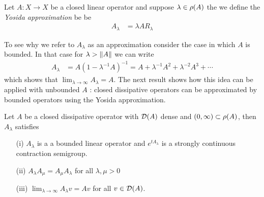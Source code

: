 \begin{defn}Let $A : X \to X$ be a closed linear operator and suppose $\lambda \in \rho(A)$ the we define the \emph{Yosida approximation} be be
\begin{align*}
A_\lambda &= \lambda A R_{\lambda}
\end{align*}
\end{defn}
To see why we refer to $A_\lambda$ as an approximation consider the case in which $A$ is bounded.  In that case for $\lambda > \lVert A \rVert$ we can write
\begin{align*}
A_\lambda &= A (1 - \lambda^{-1} A)^{-1} = A + \lambda^{-1} A^2 + \lambda^{-2} A^3 + \cdots
\end{align*}
which shows that $\lim_{\lambda \to \infty} A_\lambda = A$.
The next result shows how this idea can be applied with unbounded $A$ : closed dissipative operators can be approximated by bounded operators using the Yosida approximation.
\begin{lem}\label{ClosedDissipativeYosidaApproximation}Let $A$ be a closed dissipative operator with $\mathcal{D}(A)$ dense and $(0,\infty) \subset \rho(A)$, then $A_\lambda$ satisfies
\begin{itemize}
\item[(i)] $A_\lambda$ is a a bounded linear operator and $e^{t A_\lambda}$ is a strongly continuous contraction semigroup.
\item[(ii)] $A_\lambda A_\mu = A_\mu A_\lambda$ for all $\lambda, \mu > 0$
\item[(iii)] $\lim_{\lambda \to \infty} A_\lambda v = A v$ for all $v \in \mathcal{D}(A)$.
\end{itemize}
\end{lem}
